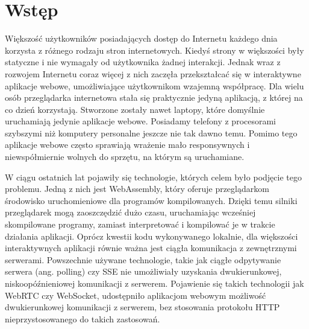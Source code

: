 \documentclass[language=polish,type=master]{aghmodern}
\author{Piotr Szczygieł}
\date{2022}
\begin{document}
\frontmatter
\maketitle

\setcounter{tocdepth}{1}
\tableofcontents

\mainmatter

\onehalfspacing

\chapter{Wstęp}
Większość użytkowników posiadających dostęp do Internetu każdego dnia korzysta z różnego rodzaju stron internetowych.
Kiedyś strony w większości były statyczne i nie wymagały od użytkownika żadnej interakcji.
Jednak wraz z rozwojem Internetu coraz więcej z nich zaczęła przekształcać się w interaktywne aplikacje webowe, umożliwiające użytkownikom wzajemną współpracę.
Dla wielu osób przeglądarka internetowa stała się praktycznie jedyną aplikacją, z której na co dzień korzystają.
Stworzone zostały nawet laptopy\footnotemark{}, które domyślnie uruchamiają jedynie aplikacje webowe.
Posiadamy telefony z procesorami szybszymi niż komputery personalne jeszcze nie tak dawno temu.
Pomimo tego aplikacje webowe często sprawiają wrażenie mało responsywnych i niewspółmiernie wolnych do sprzętu, na którym są uruchamiane.

W ciągu ostatnich lat pojawiły się technologie, których celem było podjęcie tego problemu.
Jedną z nich jest WebAssembly, który oferuje przeglądarkom środowisko uruchomieniowe dla programów kompilowanych.
Dzięki temu silniki przeglądarek mogą zaoszczędzić dużo czasu, uruchamiając wcześniej skompilowane programy, zamiast interpretować i kompilować je w trakcie działania aplikacji.
Oprócz kwestii kodu wykonywanego lokalnie, dla większości interaktywnych aplikacji równie ważna jest ciągła komunikacja z zewnętrznymi serwerami.
Powszechnie używane technologie, takie jak ciągłe odpytywanie serwera (ang. polling) czy SSE\footnotemark{} nie umożliwiały uzyskania dwukierunkowej, niskoopóźnieniowej komunikacji z serwerem.
Pojawienie się takich technologii jak WebRTC czy WebSocket, udostępniło aplikacjom webowym możliwość dwukierunkowej komunikacji z serwerem, bez stosowania protokołu HTTP nieprzystosowanego do takich zastosowań.
\end{document}
